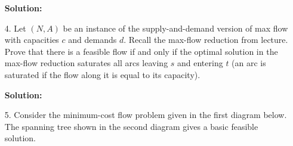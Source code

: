 \documentclass{article}
\begin{document}
\begin{enumerate}
    \textbf{Solution:} \\



    \newpage

    \item[4.] Let $(N, A)$ be an instance of the supply-and-demand version of max flow with capacities $c$ and demands $d$. Recall the max-flow reduction from lecture. Prove that there is a feasible flow if and only if the optimal solution in the max-flow reduction saturates all arcs leaving $s$ and entering $t$ (an arc is saturated if the flow along it is equal to its capacity).

    \textbf{Solution:} \\



    \newpage

    \item[5.] Consider the minimum-cost flow problem given in the first diagram below. The spanning tree shown in the second diagram gives a basic feasible solution.

    \begin{figure}[h]
    \centering
        \begin{subfigure}
            \centering
\end{subfigure}
\end{figure}
\end{enumerate}
\end{document}
